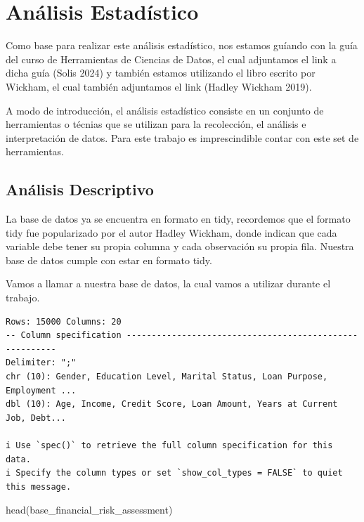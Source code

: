 \documentclass[
  letterpaper,
  DIV=11,
  numbers=noendperiod]{scrreprt}
\newenvironment{Shaded}{\begin{snugshade}}{\end{snugshade}}
\newcommand{\FunctionTok}[1]{\textcolor[rgb]{0.28,0.35,0.67}{#1}}
\newcommand{\NormalTok}[1]{\textcolor[rgb]{0.00,0.23,0.31}{#1}}
\begin{document}
\section{Análisis Estadístico}\label{anuxe1lisis-estaduxedstico}

Como base para realizar este análisis estadístico, nos estamos guíando
con la guía del curso de Herramientas de Ciencias de Datos, el cual
adjuntamos el link a dicha guía (Solis 2024) y también estamos
utilizando el libro escrito por Wickham, el cual también adjuntamos el
link (Hadley Wickham 2019).

A modo de introducción, el análisis estadístico consiste en un conjunto
de herramientas o técnias que se utilizan para la recolección, el
análisis e interpretación de datos. Para este trabajo es imprescindible
contar con este set de herramientas.

\subsection{Análisis Descriptivo}\label{anuxe1lisis-descriptivo}

La base de datos ya se encuentra en formato en tidy, recordemos que el
formato tidy fue popularizado por el autor Hadley Wickham, donde indican
que cada variable debe tener su propia columna y cada observación su
propia fila. Nuestra base de datos cumple con estar en formato tidy.

Vamos a llamar a nuestra base de datos, la cual vamos a utilizar durante
el trabajo.

\begin{verbatim}
Rows: 15000 Columns: 20
-- Column specification --------------------------------------------------------
Delimiter: ";"
chr (10): Gender, Education Level, Marital Status, Loan Purpose, Employment ...
dbl (10): Age, Income, Credit Score, Loan Amount, Years at Current Job, Debt...

i Use `spec()` to retrieve the full column specification for this data.
i Specify the column types or set `show_col_types = FALSE` to quiet this message.
\end{verbatim}

\begin{Shaded}
\begin{Highlighting}[]
\FunctionTok{head}\NormalTok{(base\_financial\_risk\_assessment)}
\end{Highlighting}
\end{Shaded}
\end{document}
